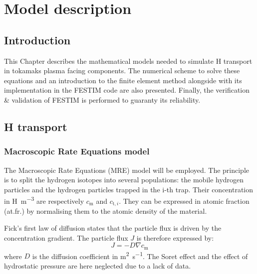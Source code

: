 \setchapterpreamble[u]{\margintoc}
\chapter{Model description}
\label{Chapter2} %
\section{Introduction}
This Chapter describes the mathematical models needed to simulate H transport in tokamaks plasma facing components.
The numerical scheme to solve these equations and an introduction to the finite element method alongside with its implementation in the FESTIM code are also presented.
Finally, the verification \& validation of FESTIM is performed to guaranty its reliability.

\section{H transport} \label{description_H_transport_model}


\subsection{Macroscopic Rate Equations model}

The Macroscopic Rate Equations (MRE) model will be employed.
The principle is to split the hydrogen isotopes into several populations: the mobile hydrogen particles and the hydrogen particles trapped in the i-th trap.
Their concentration in \si{H.m^{-3}} are respectively $c_\mathrm{m}$ and $c_{\mathrm{t},i}$.
They can be expressed in atomic fraction (at.fr.) by normalising them to the atomic density of the material.

Fick's first law of diffusion states that the particle flux is driven by the concentration gradient.
The particle flux $J$ is therefore expressed by:
\begin{equation}
    J = - D \nabla c_\mathrm{m}
\end{equation}
where $D$ is the diffusion coefficient in \si{m^2.s^{-1}}.
The Soret effect and the effect of hydrostatic pressure are here neglected due to a lack of data.


